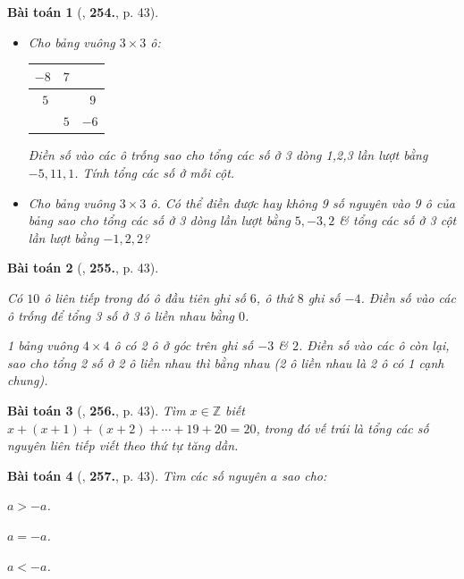 \documentclass{article}
\numberwithin{equation}{section}
\newtheorem{baitoan}{Bài toán}
\begin{document}
\begin{baitoan}[\cite{Binh_Toan_6_tap_1}, \textbf{254.}, p. 43]
	\begin{itemize}
		\item[(a)] Cho bảng vuông $3\times 3$ ô:
		\begin{table}[H]
			\centering
			\begin{tabular}{|c|c|c|}
				\hline
				$-8$ & $7$ &  \\
				\hline
				$\ \ 5$ &  & $\ \ 9$ \\
				\hline
				& $5$ & $-6$ \\
				\hline
			\end{tabular}
		\end{table}
		Điền số vào các ô trống sao cho tổng các số ở 3 dòng 1,2,3 lần lượt bằng $-5,11,1$. Tính tổng các số ở mỗi cột.
		\item[(b)] Cho bảng vuông $3\times 3$ ô. Có thể điền được hay không 9 số nguyên vào 9 ô của bảng sao cho tổng các số ở 3 dòng lần lượt bằng $5,-3,2$ \& tổng các số ở 3 cột lần lượt bằng $-1,2,2$?
	\end{itemize}
\end{baitoan}

\begin{baitoan}[\cite{Binh_Toan_6_tap_1}, \textbf{255.}, p. 43]
	\begin{enumerate*}
		\item[(a)] Có $10$ ô liên tiếp trong đó ô đầu tiên ghi số $6$, ô thứ $8$ ghi số $-4$. Điền số vào các ô trống để tổng 3 số ở 3 ô liền nhau bằng $0$.
		\item[(b)] 1 bảng vuông $4\times 4$ ô có 2 ô ở góc trên ghi số $-3$ \& $2$. Điền số vào các ô còn lại, sao cho tổng 2 số ở 2 ô liền nhau thì bằng nhau (2 ô liền nhau là 2 ô có 1 cạnh chung).
	\end{enumerate*}
\end{baitoan}

\begin{baitoan}[\cite{Binh_Toan_6_tap_1}, \textbf{256.}, p. 43]
	Tìm $x\in\mathbb{Z}$ biết $x + (x + 1) + (x + 2) + \cdots + 19 + 20 = 20$, trong đó vế trái là tổng các số nguyên liên tiếp viết theo thứ tự tăng dần.
\end{baitoan}

\begin{baitoan}[\cite{Binh_Toan_6_tap_1}, \textbf{257.}, p. 43]
	Tìm các số nguyên $a$ sao cho:
	\begin{enumerate*}
		\item[(a)] $a > -a$.
		\item[(b)] $a = -a$.
		\item[(c)] $a < -a$.
	\end{enumerate*}
\end{baitoan}
\end{document}
